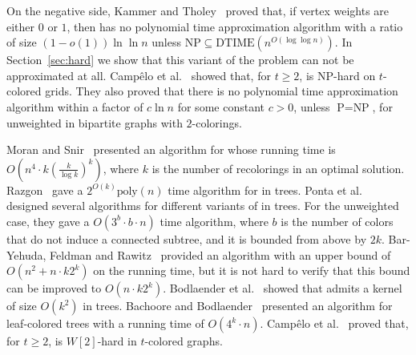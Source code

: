 On the negative side, 
Kammer and Tholey~\cite{kammer2012complexity}
proved that, if vertex weights are either $0$ or $1$, 
then \TWOCR{} has no polynomial time approximation algorithm with a ratio of size 
$(1 - o(1))\ln\ln n$ 
unless $\text{NP} \subseteq \text{DTIME}(n^{O(\log\log n)})$.
In Section~\ref{sec:hard} we show 
that this variant of the problem can not be approximated at all. 
%
Camp\^{e}lo et al.~\cite{campelo2013complexity} showed that,
for $t \geq 2$, 
\CRP{} is NP-hard on $t$-colored grids. 
%
They also proved that there is no polynomial time approximation algorithm 
within a factor of $c\ln n$ for some constant $c > 0$, 
unless $\text{P} = \text{NP}$, 
for unweighted \CRP{} in bipartite graphs with $2$-colorings.


Moran and Snir~\cite{MoranSnir08} presented an algorithm for \CRP{}
whose running time is $O(n^4 \cdot k (\frac{k}{\log k})^k)$,
where $k$ is the number of recolorings in an optimal solution.
%
Razgon~\cite{Razgon07} gave a $2^{O(k)} \text{poly}(n)$ time algorithm for \CRP{} in trees.
%
Ponta et al.~\cite{ponta2008speeding} 
designed several algorithms for different variants of \CRP{} in trees. 
%
For the unweighted case, 
they gave a $O(3^b \cdot b \cdot n)$ time algorithm, 
where $b$ is the number of colors that do not induce a connected subtree,
and it is bounded from above by $2k$.
%  
Bar-Yehuda, Feldman and Rawitz~\cite{BFR08} 
provided an algorithm with an upper bound of $O(n^2 + n \cdot k 2^k)$ on the running time, 
but it is not hard to verify that this bound can be improved to $O(n \cdot k 2^k)$.
%
Bodlaender et al.~\cite{BFLRRW11} showed that \CRP{}  admits a kernel of size $O(k^2)$
in trees.
%
Bachoore and Bodlaender~\cite{bachoore2006convex} 
presented an algorithm for leaf-colored trees with a running time of $O(4^k \cdot n)$. 
%
Camp\^{e}lo et al.~\cite{campelo2013complexity} proved that, 
for $t \geq 2$, 
\CRP{} is $W[2]$-hard in $t$-colored graphs.


